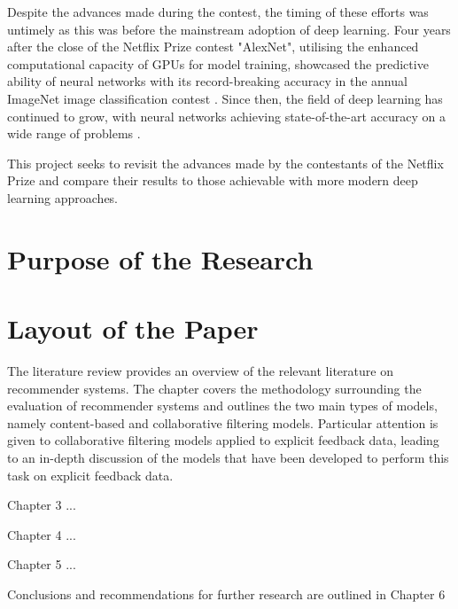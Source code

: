 Despite the advances made during the contest, the timing of these efforts was untimely as this was before the mainstream adoption of deep learning. Four years after the close of the Netflix Prize contest "AlexNet", utilising the enhanced computational capacity of GPUs for model training, showcased the predictive ability of neural networks with its record-breaking accuracy in the annual ImageNet image classification contest \parencite{krizhevsky2012imagenet}. Since then, the field of deep learning has continued to grow, with neural networks achieving state-of-the-art accuracy on a wide range of problems \parencite{alom2018history}.

This project seeks to revisit the advances made by the contestants of the Netflix Prize and compare their results to those achievable with more modern deep learning approaches.

\section{Purpose of the Research}


\section{Layout of the Paper}
The literature review provides an overview of the relevant literature on recommender systems. The chapter covers the methodology surrounding the evaluation of recommender systems and outlines the two main types of models, namely content-based and collaborative filtering models. Particular attention is given to collaborative filtering models applied to explicit feedback data, leading to an in-depth discussion of the models that have been developed to perform this task on explicit feedback data.

Chapter 3 ...

Chapter 4 ...

Chapter 5 ...

Conclusions and recommendations for further research are outlined in Chapter 6


 